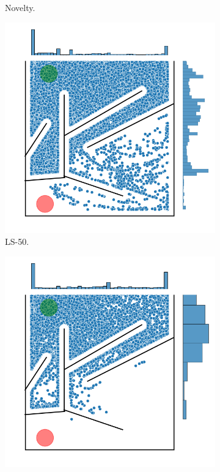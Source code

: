 \begin{figure}[H]
\begin{mdframed}
\begin{subfigure}[b]{0.5\textwidth}
            \caption{Novelty.}
        \end{subfigure}
        \begin{subfigure}[b]{0.5\textwidth}
            \includegraphics[scale=0.4]{resources/mazes/fitness_novelty_open_all_runs.png}
            \caption{LS-50.}
        \end{subfigure}
        \begin{subfigure}[b]{0.5\textwidth}
            \includegraphics[scale=0.4]{resources/mazes/dynamic_open_all_runs.png}

\end{subfigure}
\end{mdframed}
\end{figure}
